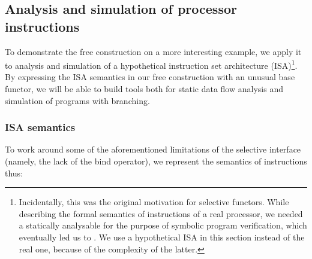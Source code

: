




\subsection{Analysis and simulation of processor instructions}\label{sec-free-isa}

To demonstrate the free construction on a more interesting example, we apply it
to analysis and simulation of a hypothetical instruction set architecture
(ISA)\footnote{Incidentally, this was the original motivation for selective
functors. While describing the formal semantics of instructions of a real
processor, we needed a statically analysable  for the purpose of
symbolic program verification, which eventually led us to . We use a
hypothetical ISA in this section instead of the real one, because of the
complexity of the latter.}. By expressing the ISA semantics in our
free construction with an unusual base functor, we will be able to build
tools both for static data flow analysis and simulation of programs with
branching.

\vspace{-1mm}
\subsubsection{ISA semantics}
To work around some of the aforementioned limitations of the selective
interface (namely, the lack of the bind operator), we represent the semantics of
instructions thus:

